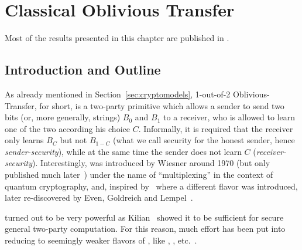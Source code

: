 \chapter{Classical Oblivious Transfer}  \label{chap:ClassicalOT}
Most of the results presented in this chapter are published in \cite{DFSS06}.


\section{Introduction and Outline} \label{sec:introtoNDLF}
As already mentioned in Section~\ref{sec:cryptomodels}, 1-out-of-2
Oblivious-Transfer, \OT for short, is a two-party primitive which
allows a sender to send two bits (or, more generally, strings) $B_0$
and $B_1$ to a receiver, who is allowed to learn one of the two
according his choice $C$. Informally, it is required that the receiver
only learns $B_C$ but not $B_{1-C}$ (what we call security for the
honest sender, hence {\em sender-security}), while at the same time
the sender does not learn $C$ ({\em {}receiver-security}).
Interestingly, \OT was introduced by Wiesner around 1970 (but only
published much later~\cite{Wiesner83}) under the name of
``multiplexing'' in the context of quantum cryptography, and, inspired
by~\cite{Rabin81} where a different flavor was introduced, later
re-discovered by Even, Goldreich and Lempel~\cite{EGL82}.

\OT turned out to be very powerful as Kilian~\cite{Kilian88} showed it
to be sufficient for secure general two-party computation.  For this
reason, much effort has been put into reducing \OT to seemingly weaker
flavors of \pOT, like \RabinOT, \XOT,
etc.~\cite{Crepeau87,BC97,Cachin98,Wolf00,BCW03,CS06}.

